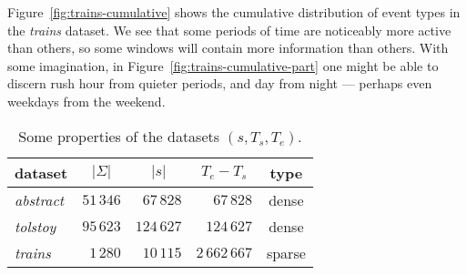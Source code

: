 Figure~\ref{fig:trains-cumulative} shows the cumulative distribution of event types in the \emph{trains} dataset. We see that some periods of time are noticeably more active than others, so some windows will contain more information than others. With some imagination, in Figure~\ref{fig:trains-cumulative-part} one might be able to discern rush hour from quieter periods, and day from night --- perhaps even weekdays from the weekend.

\begin{table}[t]
\centering

\begin{tabulary}{\textwidth}{ L|RRRC }

dataset &  &  &  & type \\
\hline
\emph{abstract} & $ 51\,346 $ & $ 67\,828 $ & $ 67\,828 $ & dense \\
\emph{tolstoy} & $ 95\,623 $ & $ 124\,627 $ & $ 124\,627 $ & dense \\
\emph{trains} & $ 1\,280 $ & $ 10\,115 $ & $ 2\,662\,667 $ & sparse \\

\end{tabulary}

\caption{Some properties of the datasets $ (s, T_s, T_e) $.}
\label{table:datasets-numbers}
\end{table}
